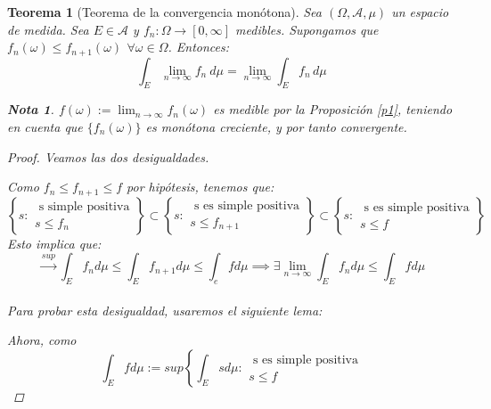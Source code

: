 \documentclass[11pt, a4paper]{article}
\theoremstyle{theorem-style}
\newtheorem{nth}{Teorema}[section]
\theoremstyle{definition-style}
\theoremstyle{remark-style}
\newtheorem*{nota}{Nota}
\theoremstyle{example-style}
\begin{document}

\begin{nth}[Teorema de la convergencia monótona]
  Sea $(\Omega,\mathcal{A},\mu)$ un espacio de medida. Sea $E\in \mathcal A$ y $f_n: \Omega \to [0,\infty]$ medibles. Supongamos que $f_n(\omega) \leq f_{n+1}(\omega) \, \ \forall \omega \in \Omega$. Entonces:
  \[
    \int_E \lim_{n \to \infty} f_n\ d\mu = \lim_{n \to \infty}\int_E f_n\, d \mu
  \]
  \begin{nota}
    $\displaystyle f(\omega):= \lim _{n\to \infty} f_n(\omega)$ es medible por la \textit{Proposición \ref{p1}}, teniendo en cuenta que $\{f_n(\omega)\}$ es monótona creciente, y por tanto convergente.
  \end{nota}

  \begin{proof} Veamos las dos desigualdades.

    \boxed{\leq} Como $f_n \leq f_{n+1} \leq f$ por hipótesis, tenemos que:
    \[
    \left\{ s  : \begin{array}{r} \text{ s simple positiva}\\
        s \leq f_n 
      \end{array}\right\}  \subset \left\{ s: \begin{array}{r} \text{ s es simple positiva}\\
        s\leq f_{n+1}
	
      \end{array} \right\} \subset \left\{s: \begin{array}{r}\text{ s es simple positiva}\\ s \leq f
	
      \end{array}\right\}
    \]
    Esto implica que:
    \[
      \xrightarrow{sup} \int_E f_n d \mu \leq \int_E f_{n+1} d\mu \leq \int_e f d \mu \implies \exists \lim_{n\to \infty} \int_E f_n d\mu \leq \int_E f d \mu
    \]
    \boxed{\geq}\hfill \\
    Para probar esta desigualdad, usaremos el siguiente lema: 

    Ahora, como
    \[
      \int_E f d \mu:= sup \left\{\int_E s d\mu : \begin{array}{l} \text{ s es simple positiva}\\
        s \leq f
	

\end{array}\]
\end{proof}
\end{nth}
\end{document}
